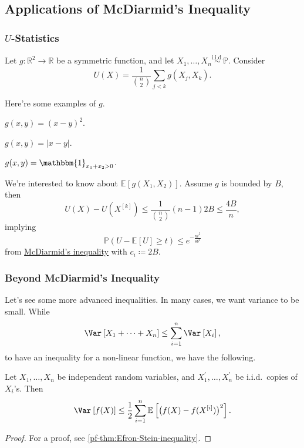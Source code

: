 \subsection{Applications of McDiarmid's Inequality}
\subsubsection{\(U\)-Statistics}

Let \(g\colon \mathbb{R} ^2 \to \mathbb{R} \) be a symmetric function, and let \(X_1, \dots , X_n \overset{\text{i.i.d.} }{\sim } \mathbb{P} \). Consider
\[
	U(X) = \frac{1}{\binom{n}{2}} \sum_{j < k} g(X_j, X_k).
\]

Here're some examples of \(g\).
\begin{eg}
	\(g(x, y) = (x - y)^2\).
\end{eg}

\begin{eg}
	\(g(x, y) = \vert x - y \vert \).
\end{eg}

\begin{eg}
	\(g(x, y) = \mathbbm{1}_{x_1 + x_2 > 0} \).
\end{eg}

We're interested to know about \(\mathbb{E}_{}\left[g(X_1, X_2) \right] \). Assume \(g\) is bounded by \(B\), then
\[
	U(X) - U(X^{[k]}) \leq \frac{1}{\binom{n}{2}} (n-1) 2B \leq \frac{4B}{n},
\]
implying
\[
	\mathbb{P} (U - \mathbb{E}_{}\left[U \right] \geq t) \leq e^{-\frac{nt^2}{8b^2}}
\]
from \hyperref[thm:McDiarmid-inequality]{McDiarmid's inequality} with \(c_i \coloneqq 2B\).

\subsubsection{Beyond McDiarmid's Inequality}
Let's see some more advanced inequalities. In many cases, we want variance to be small. While
\[
	\Var_{}\left[X_1 + \dots + X_n \right] \leq \sum_{i=1}^{n} \Var_{}\left[X_i \right],
\]
to have an inequality for a non-linear function, we have the following.

\begin{theorem}\label{thm:Efron-Stein-inequality}
	Let \(X_1, \dots , X_n\) be independent random variables, and \(X_1^{\prime} , \dots , X_n^{\prime} \) be i.i.d.\ copies of \(X_i\)'s. Then
	\[
		\Var_{}\left[f(X) \right] \leq \frac{1}{2} \sum_{i=1}^{n} \mathbb{E}_{}\left[\big(f(X) - f(X^{[i]}) \big)^2 \right].
	\]
\end{theorem}
\begin{proof}
	For a proof, see \autoref{pf-thm:Efron-Stein-inequality}.
\end{proof}

